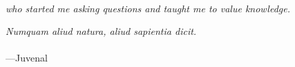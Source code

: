 \begin{frontmatter}
\makefrontmatter                                                               


\begin{mydedication}    
        	\vfil                                                 
	 \hfill \\
	\hfill {\it who started me asking questions and taught me to value knowledge.} \\
	\vfil
	\vfil
	\vfil
\end{mydedication}                                                               
\clearpage 


\begin{myepigraph} %
  \vfil                                                                        
  \vfil 
  \hfill {\it Numquam aliud natura, aliud sapientia dicit.} \\
  \vfil 
   \hfill \\
  \vfil 
  \hfill ---Juvenal
  \vfil 
\end{myepigraph}                                                               

\tableofcontents
\listoffigures  %
\listoftables   %


\end{frontmatter}
